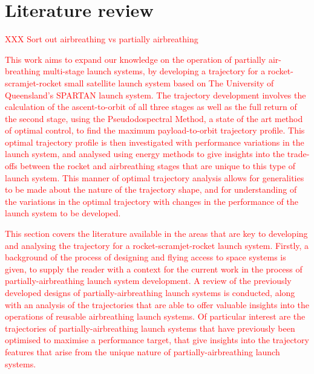 
\cleardoublepage
\chapter{Literature review}\label{chapter:literature-review}

 \textcolor{red}{XXX Sort out airbreathing vs partially airbreathing}

  \textcolor{red}{
This work aims to expand our knowledge on the operation of partially air-breathing multi-stage launch systems, by developing a trajectory for a rocket-scramjet-rocket small satellite launch system based on The University of Queensland's SPARTAN launch system. The trajectory development involves the calculation of the ascent-to-orbit of all three stages as well as the full return of the second stage, using the Pseudodospectral Method, a state of the art method of optimal control, to find the maximum payload-to-orbit trajectory profile. This optimal trajectory profile is then investigated with performance variations in the launch system, and analysed using energy methods to give insights into the trade-offs between the rocket and airbreathing stages that are unique to this type of launch system. This manner of optimal trajectory analysis allows for generalities to be made about the nature of the trajectory shape, and for understanding of the variations in the optimal trajectory with changes in the performance of the launch system to be developed.}

\textcolor{red}{
This section covers the literature available in the areas that are key to developing and analysing the trajectory for a rocket-scramjet-rocket launch system. Firstly, a background of the process of designing and flying access to space systems is given, to supply the reader with a context for the current work in the process of partially-airbreathing launch system development. 
A review of the previously developed designs of partially-airbreathing launch systems is conducted, along with an analysis of the trajectories that are able to offer valuable insights into the operations of reusable airbreathing launch systems. Of particular interest are the trajectories of partially-airbreathing launch systems that have previously been optimised to maximise a performance target, that give insights into the trajectory features that arise from the unique nature of partially-airbreathing launch systems. 
}
  
  
  
  
  
